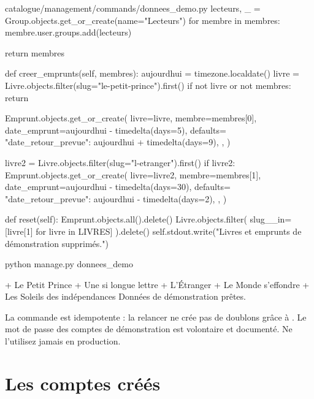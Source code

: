 \begin{codebox}[python]{catalogue/management/commands/donnees\_demo.py}
        lecteurs, _ = Group.objects.get_or_create(name="Lecteurs")
        for membre in membres:
            membre.user.groups.add(lecteurs)

        return membres

    def creer_emprunts(self, membres):
        aujourdhui = timezone.localdate()
        livre = Livre.objects.filter(slug="le-petit-prince").first()
        if not livre or not membres:
            return

        Emprunt.objects.get_or_create(
            livre=livre,
            membre=membres[0],
            date_emprunt=aujourdhui - timedelta(days=5),
            defaults={
                "date_retour_prevue": aujourdhui + timedelta(days=9),
            },
        )

        livre2 = Livre.objects.filter(slug="l-etranger").first()
        if livre2:
            Emprunt.objects.get_or_create(
                livre=livre2,
                membre=membres[1],
                date_emprunt=aujourdhui - timedelta(days=30),
                defaults={
                    "date_retour_prevue": aujourdhui - timedelta(days=2),
                },
            )

    def reset(self):
        Emprunt.objects.all().delete()
        Livre.objects.filter(
            slug__in=[livre[1] for livre in LIVRES]
        ).delete()
        self.stdout.write("Livres et emprunts de démonstration supprimés.")
\end{codebox}

\begin{terminal}
python manage.py donnees_demo
\end{terminal}

\begin{terminal}
  + Le Petit Prince
  + Une si longue lettre
  + L'Étranger
  + Le Monde s'effondre
  + Les Soleils des indépendances
Données de démonstration prêtes.
\end{terminal}

\begin{note}
La commande est idempotente : la relancer ne crée pas de doublons grâce à
. Le mot de passe des comptes de démonstration est volontaire
et documenté. Ne l'utilisez jamais en production.
\end{note}

\section{Les comptes créés}

